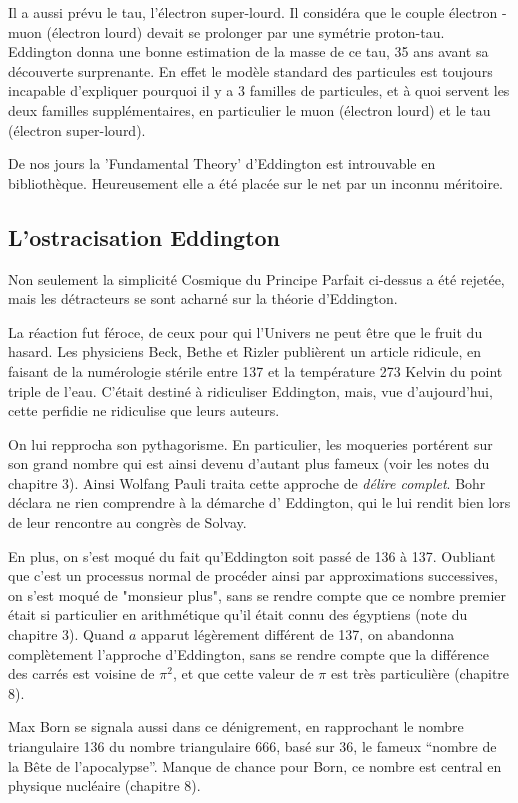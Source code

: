 \documentclass[a4paper,12pt]{article}
\begin{document}
Il a aussi prévu le tau, l'électron super-lourd. Il considéra que le couple électron - muon (électron lourd) devait se prolonger par une symétrie proton-tau. Eddington donna une bonne estimation de la masse de ce tau, 35 ans avant sa découverte surprenante. En effet le modèle standard des particules est toujours incapable d'expliquer pourquoi il y a 3 familles de particules, et à quoi servent les deux familles supplémentaires, en particulier le muon (électron lourd) et le tau (électron super-lourd).

De nos jours la 'Fundamental Theory' d'Eddington est introuvable en bibliothèque. Heureusement elle a été placée sur le net par un inconnu méritoire.  



\subsection{L'ostracisation Eddington}
Non seulement la simplicité Cosmique du Principe Parfait ci-dessus a été rejetée, mais les détracteurs se sont acharné sur la théorie d'Eddington.

La réaction fut féroce, de ceux pour qui l'Univers ne peut être que le fruit du hasard. Les physiciens Beck, Bethe et Rizler publièrent un article ridicule, en faisant de la numérologie stérile entre 137 et la température 273 Kelvin du point triple de l'eau. C'était destiné à ridiculiser Eddington, mais, vue d'aujourd'hui, cette perfidie ne ridiculise que leurs auteurs.

On lui repprocha son pythagorisme. En particulier, les moqueries portérent sur son grand nombre qui est ainsi devenu d'autant plus fameux (voir les notes du chapitre 3). Ainsi Wolfang Pauli traita cette approche de \textit{délire complet}. Bohr déclara ne rien comprendre à la démarche d' Eddington, qui le lui rendit bien lors de leur rencontre au congrès de Solvay.

En plus, on s'est moqué du fait qu'Eddington soit passé de 136 à 137. Oubliant que c'est un processus normal de procéder ainsi par approximations successives, on s'est moqué de "monsieur plus", sans se rendre compte que ce nombre premier était si particulier en arithmétique qu'il était connu des égyptiens (note du chapitre 3). Quand $a$ apparut légèrement différent de 137, on abandonna complètement l'approche d'Eddington, sans se rendre compte que la différence des carrés est voisine de $\pi^2$, et que cette valeur de $\pi$ est très particulière (chapitre 8).
 
Max Born se signala aussi dans ce dénigrement, en rapprochant le nombre triangulaire 136 du nombre triangulaire 666, basé sur 36, le fameux ``nombre de la Bête de l'apocalypse''. Manque de chance pour Born, ce nombre est central en physique nucléaire (chapitre 8). 
\end{document}
